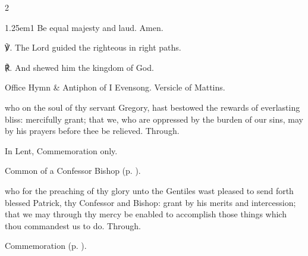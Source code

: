 \begin{paracol}{2}
\begin{hangparas}{1.25em}{1}
Be equal majesty and laud. Amen.\\
\end{hangparas}

    ℣. The Lord guided the righteous in right paths.

	℟. And shewed him the kingdom of God.


\secondEvensong

\begin{rubric}
	Office Hymn \& Antiphon of I Evensong. Versicle of Mattins.
\end{rubric}

\fussy	
\end{paracol}


\collect
{} who on the soul of thy servant Gregory, hast bestowed the rewards of everlasting bliss: mercifully grant; that we, who are oppressed by the burden of our sins, may by his prayers before thee be relieved. Through.



\begin{rubric}
	In Lent, Commemoration only.
\end{rubric}

\begin{rubric}
	Common of a Confessor Bishop (p. \pageref{CommonConfessorBishop}).
\end{rubric}

 who for the preaching of thy glory unto the Gentiles wast pleased to send forth blessed Patrick, thy Confessor and Bishop: grant by his merits and intercession; that we may through thy mercy be enabled to accomplish those things which thou commandest us to do. Through.

\begin{rubric}
    Commemoration  (p. \pageref{ArimatheanCollect}).
\end{rubric}





